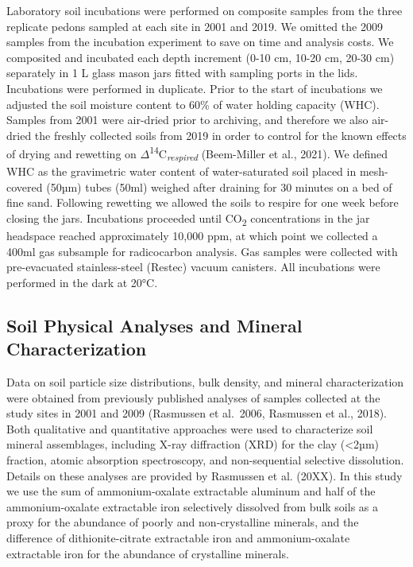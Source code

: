 \documentclass[english,man,floatsintext]{apa6}
\begin{document}
Laboratory soil incubations were performed on composite samples from the three replicate pedons sampled at each site in 2001 and 2019. We omitted the 2009 samples from the incubation experiment to save on time and analysis costs. We composited and incubated each depth increment (0-10 cm, 10-20 cm, 20-30 cm) separately in 1 L glass mason jars fitted with sampling ports in the lids. Incubations were performed in duplicate. Prior to the start of incubations we adjusted the soil moisture content to 60\% of water holding capacity (WHC). Samples from 2001 were air-dried prior to archiving, and therefore we also air-dried the freshly collected soils from 2019 in order to control for the known effects of drying and rewetting on \(\Delta\)\textsuperscript{14}C\textsubscript{\emph{respired}} (Beem-Miller et al., 2021). We defined WHC as the gravimetric water content of water-saturated soil placed in mesh-covered (50µm) tubes (50ml) weighed after draining for 30 minutes on a bed of fine sand. Following rewetting we allowed the soils to respire for one week before closing the jars. Incubations proceeded until CO\textsubscript{2} concentrations in the jar headspace reached approximately 10,000 ppm, at which point we collected a 400ml gas subsample for radicocarbon analysis. Gas samples were collected with pre-evacuated stainless-steel (Restec) vacuum canisters. All incubations were performed in the dark at 20°C.

\hypertarget{soil-physical-analyses-and-mineral-characterization}{%
\subsection{Soil Physical Analyses and Mineral Characterization}\label{soil-physical-analyses-and-mineral-characterization}}

Data on soil particle size distributions, bulk density, and mineral characterization were obtained from previously published analyses of samples collected at the study sites in 2001 and 2009 (Rasmussen et al.~2006, Rasmussen et al., 2018). Both qualitative and quantitative approaches were used to characterize soil mineral assemblages, including X-ray diffraction (XRD) for the clay (\textless{}2µm) fraction, atomic absorption spectroscopy, and non-sequential selective dissolution. Details on these analyses are provided by Rasmussen et al. (20XX). In this study we use the sum of ammonium-oxalate extractable aluminum and half of the ammonium-oxalate extractable iron selectively dissolved from bulk soils as a proxy for the abundance of poorly and non-crystalline minerals, and the difference of dithionite-citrate extractable iron and ammonium-oxalate extractable iron for the abundance of crystalline minerals.
\end{document}
